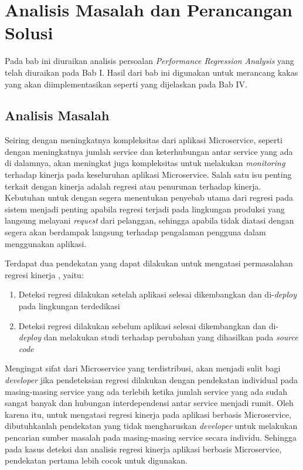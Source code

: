 \chapter{Analisis Masalah dan Perancangan Solusi}
Pada bab ini diuraikan analisis persoalan \textit{Performance Regression Analysis} yang telah diuraikan pada Bab I. Hasil dari bab ini digunakan untuk merancang kakas yang akan diimplementasikan seperti yang dijelaskan pada Bab IV. 


\section{Analisis Masalah}
\label{analisis-masalah}

Seiring dengan meningkatnya kompleksitas dari aplikasi Microservice, seperti dengan meningkatnya jumlah service dan keterhubungan antar service yang ada di dalamnya, akan meningkat juga kompleksitas untuk melakukan \textit{monitoring} terhadap kinerja pada keseluruhan aplikasi Microservice. Salah satu isu penting terkait dengan kinerja adalah regresi atau penurunan terhadap kinerja. Kebutuhan untuk dengan segera menentukan penyebab utama dari regresi pada sistem menjadi penting apabila regresi terjadi pada lingkungan produksi yang langsung melayani \textit{request} dari pelanggan, sehingga apabila tidak diatasi dengan segera akan berdampak langsung terhadap pengalaman pengguna dalam menggunakan aplikasi. 

Terdapat dua pendekatan yang dapat dilakukan untuk mengatasi permasalahan regresi kinerja \citep{regression-detection}, yaitu:
\begin{enumerate}
	\item Deteksi regresi dilakukan setelah aplikasi selesai dikembangkan dan di-\textit{deploy} pada lingkungan terdedikasi
	\item Deteksi regresi dilakukan sebelum aplikasi selesai dikembangkan dan di-\textit{deploy} dan melakukan studi terhadap perubahan yang dihasilkan pada \textit{source code}
\end{enumerate}  

Mengingat sifat dari Microservice yang terdistribusi, akan menjadi sulit bagi \textit{developer} jika pendeteksian regresi dilakukan dengan pendekatan individual pada masing-masing service yang ada terlebih ketika jumlah service yang ada sudah sangat banyak dan hubungan interdependensi antar service menjadi rumit. Oleh karena itu, untuk mengatasi regresi kinerja pada aplikasi berbasis Microservice, dibutuhkanlah pendekatan yang tidak mengharuskan \textit{developer} untuk melakukan pencarian sumber masalah pada masing-masing service secara individu. Sehingga pada kasus deteksi dan analisis regresi kinerja aplikasi berbasis Microservice, pendekatan pertama lebih cocok untuk digunakan.


